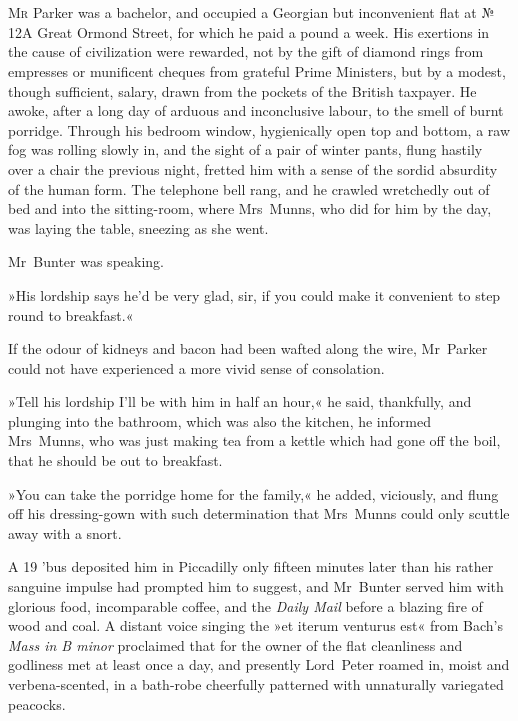 \chapter[Chapter \thechapter]{}
\lettrine[lines=4]{M}{r} Parker was a bachelor, and occupied a Georgian but inconvenient flat at № 12A Great Ormond Street, for which he paid a pound a week. His exertions in the cause of civilization were rewarded, not by the gift of diamond rings from empresses or munificent cheques from grateful Prime Ministers, but by a modest, though sufficient, salary, drawn from the pockets of the British taxpayer. He awoke, after a long day of arduous and inconclusive labour, to the smell of burnt porridge. Through his bedroom window, hygienically open top and bottom, a raw fog was rolling slowly in, and the sight of a pair of winter pants, flung hastily over a chair the previous night, fretted him with a sense of the sordid absurdity of the human form. The telephone bell rang, and he crawled wretchedly out of bed and into the sitting-room, where Mrs~Munns, who did for him by the day, was laying the table, sneezing as she went.

Mr~Bunter was speaking.

»His lordship says he'd be very glad, sir, if you could make it convenient to step round to breakfast.«

If the odour of kidneys and bacon had been wafted along the wire, Mr~Parker could not have experienced a more vivid sense of consolation.

»Tell his lordship I'll be with him in half an hour,« he said, thankfully, and plunging into the bathroom, which was also the kitchen, he informed Mrs~Munns, who was just making tea from a kettle which had gone off the boil, that he should be out to breakfast.

»You can take the porridge home for the family,« he added, viciously, and flung off his dressing-gown with such determination that Mrs~Munns could only scuttle away with a snort.

A 19 'bus deposited him in Piccadilly only fifteen minutes later than his rather sanguine impulse had prompted him to suggest, and Mr~Bunter served him with glorious food, incomparable coffee, and the \textit{Daily Mail} before a blazing fire of wood and coal. A distant voice singing the »et iterum venturus est« from Bach's \textit{Mass in B minor} proclaimed that for the owner of the flat cleanliness and godliness met at least once a day, and presently Lord~Peter roamed in, moist and verbena-scented, in a bath-robe cheerfully patterned with unnaturally variegated peacocks.

